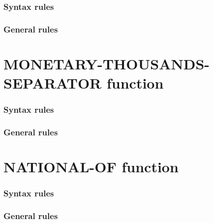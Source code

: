 \begin{syntax}[\gnucobolcolour]
   
\end{syntax}

\subsubsection{Syntax rules}

\subsubsection{General rules}

\section{MONETARY-THOUSANDS-SEPARATOR function}

\begin{syntax}[\gnucobolcolour]
   
\end{syntax}

\subsubsection{Syntax rules}

\subsubsection{General rules}

\section{NATIONAL-OF function}

\begin{syntax}
\end{syntax}

\subsubsection{Syntax rules}

\subsubsection{General rules}

